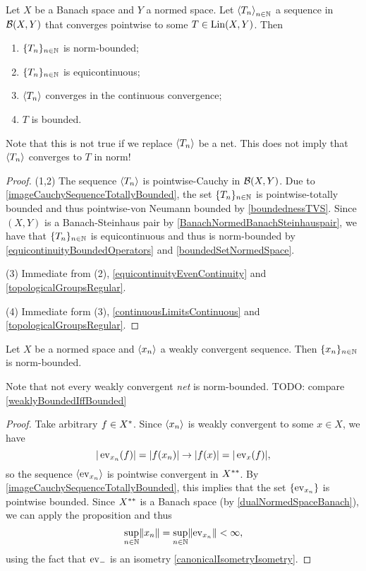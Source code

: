 \begin{proposition} \label{BanachSteinhaus}
Let $X$ be a Banach space and $Y$ a normed space. Let $\left\langle T_n \right\rangle_{n\in \mathbb{N}}$ a sequence in $\operatorname{\mathcal{B}}(X, Y)$ that converges pointwise to some $T\in \operatorname{Lin}(X,Y)$. Then
\begin{enumerate}
\item $\{T_n\}_{n\in \mathbb{N}}$ is norm-bounded;
\item $\{T_n\}_{n\in \mathbb{N}}$ is equicontinuous;
\item $\left\langle T_n \right\rangle$ converges in the continuous convergence;
\item $T$ is bounded.
\end{enumerate}
\end{proposition}
Note that this is not true if we replace $\left\langle T_n \right\rangle$ be a net. This does not imply that $\left\langle T_n \right\rangle$ converges to $T$ in norm!
\begin{proof}
(1,2) The sequence $\left\langle T_n \right\rangle$ is pointwise-Cauchy in $\operatorname{\mathcal{B}}(X,Y)$. Due to \ref{imageCauchySequenceTotallyBounded}, the set $\{T_n\}_{n\in \mathbb{N}}$ is pointwise-totally bounded and thus pointwise-von Neumann bounded by \ref{boundednessTVS}. Since $(X, Y)$ is a Banach-Steinhaus pair by \ref{BanachNormedBanachSteinhauspair}, we have that $\{T_n\}_{n\in \mathbb{N}}$ is equicontinuous and thus is norm-bounded by \ref{equicontinuityBoundedOperators} and \ref{boundedSetNormedSpace}.

(3) Immediate from (2), \ref{equicontinuityEvenContinuity} and \ref{topologicalGroupsRegular}.

(4) Immediate form (3), \ref{continuousLimitsContinuous} and \ref{topologicalGroupsRegular}.
\end{proof}
\begin{corollary} \label{weaklyConvergentSequenceNormBounded}
Let $X$ be a normed space and $\left\langle x_n \right\rangle$ a weakly convergent sequence. Then $\{x_n\}_{n\in \mathbb{N}}$ is norm-bounded.
\end{corollary}
Note that not every weakly convergent \emph{net} is norm-bounded. TODO: compare \ref{weaklyBoundedIffBounded}
\begin{proof}
Take arbitrary $f\in {X}^*$. Since $\left\langle x_n \right\rangle$ is weakly convergent to some $x\in X$, we have
\[ |\operatorname{ev}_{x_n}(f)| = |f(x_n)| \to |f(x)| = |\operatorname{ev}_x(f)|, \]
so the sequence $\left\langle \operatorname{ev}_{x_n} \right\rangle$ is pointwise convergent in ${X}^{**}$. By \ref{imageCauchySequenceTotallyBounded}, this implies that the set $\{\operatorname{ev}_{x_n}\}$ is pointwise bounded. Since ${X}^{**}$ is a Banach space (by \ref{dualNormedSpaceBanach}), we can apply the proposition and thus
\[ \sup_{n\in \mathbb{N}}\lVert x_n\rVert = \sup_{n\in \mathbb{N}}\lVert\operatorname{ev}_{x_n}\rVert < \infty, \]
using the fact that $\operatorname{ev}_-$ is an isometry \ref{canonicalIsometryIsometry}.
\end{proof}

